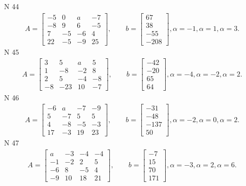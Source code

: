 \documentclass[11pt]{report}
\begin{document}
N 44
\begin{align*}
 A = \left[\begin{matrix}-5 & 0 & a & -7\\-8 & 9 & 6 & -5\\7 & -5 & -6 & 4\\22 & -5 & -9 & 25\end{matrix}\right],
    \qquad b = \left[\begin{matrix}67\\38\\-55\\-208\end{matrix}\right], \alpha = -1, \alpha = 1, \alpha = 3. 
 \end{align*}
N 45
\begin{align*}
 A = \left[\begin{matrix}3 & 5 & a & 5\\1 & -8 & -2 & 8\\2 & 5 & -4 & -8\\-8 & -23 & 10 & -7\end{matrix}\right],
    \qquad b = \left[\begin{matrix}-42\\-20\\65\\64\end{matrix}\right], \alpha = -4, \alpha = -2, \alpha = 2. 
 \end{align*}
N 46
\begin{align*}
 A = \left[\begin{matrix}-6 & a & -7 & -9\\5 & -7 & 5 & 5\\4 & -8 & -5 & -3\\17 & -3 & 19 & 23\end{matrix}\right],
    \qquad b = \left[\begin{matrix}-31\\-48\\-137\\50\end{matrix}\right], \alpha = -2, \alpha = 0, \alpha = 2. 
 \end{align*}
N 47
\begin{align*}
 A = \left[\begin{matrix}a & -3 & -4 & -4\\-1 & -2 & 2 & 5\\-6 & 8 & -5 & 4\\-9 & 10 & 18 & 21\end{matrix}\right],
    \qquad b = \left[\begin{matrix}-7\\15\\70\\171\end{matrix}\right], \alpha = -3, \alpha = 2, \alpha = 6. 
 \end{align*}
\end{document}
